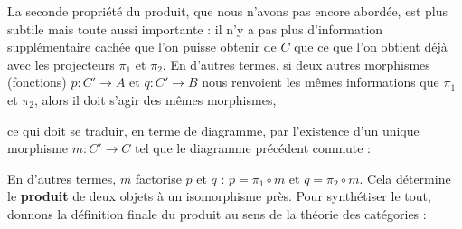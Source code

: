 \documentclass{article}
\begin{document}
La seconde propriété du produit, que nous n'avons pas encore abordée, est plus subtile mais toute aussi importante : il n'y a pas plus d'information supplémentaire cachée que l'on puisse obtenir de $C$ que ce que l'on obtient déjà avec les projecteurs $\pi_1$ et $\pi_2$. En d'autres termes, si deux autres morphismes (fonctions) $p:C'\to A$ et $q:C'\to B$ nous renvoient les mêmes informations que $\pi_1$ et $\pi_2$, alors il doit s'agir des mêmes morphismes,

\begin{center}
\end{center}

\noindent
ce qui doit se traduir, en terme de diagramme, par l'existence d'un unique morphisme $m:C'\to C$ tel que le diagramme précédent commute :

\begin{center}
\end{center}

\noindent
En d'autres termes, $m$ factorise $p$ et $q$ : $p=\pi_1\circ m$ et $q=\pi_2\circ m$. Cela détermine le \textbf{produit} de deux objets à un isomorphisme près. Pour synthétiser le tout, donnons la définition finale du produit au sens de la théorie des catégories :
\end{document}

